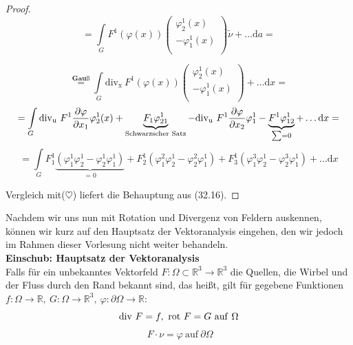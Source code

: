 \begin{proof}
\begin{equation*}
=
    \int\limits_G F^1(\varphi(x))
    \begin{pmatrix}
        \varphi_2^1(x) \\
        -\varphi_1^1(x) \\
    \end{pmatrix}
    \tilde{\nu}
    + \ldots \mathrm{d}a = 
\end{equation*}
    
\begin{equation*}
\stackrel{\textbf{Gauß}}{=}
    \int\limits_G \mathrm{div_x } \ F^1(\varphi(x))
    \begin{pmatrix}
        \varphi_2^1(x) \\
        -\varphi_1^1(x) \\
    \end{pmatrix}
    + \ldots \mathrm{d}x = 
\end{equation*}
\begin{equation*}
=
    \int\limits_G 
    \mathrm{div_u } \ F^1 \frac{\partial{\varphi}}{\partial{x_1}} \varphi_2^1(x)
    + \underbrace{F_1 \varphi_{21}^1}_{\text{Schwarzscher Satz}}
    - \mathrm{div_u } \ F^1 \frac{\partial{\varphi}}{\partial{x_2}} \varphi_1^1
    - \underbrace{F^1 \varphi_{12}^1}_{\sum = 0}
    + \ldots \mathrm{d}x = 
\end{equation*}
\begin{equation*}
=
    \int\limits_G F_1^1 
    \underbrace{\left( \varphi_1^1 \varphi_2^1 - \varphi_2^1 \varphi_1^1 \right)}_{=0}
    + F_2^1 \left( \varphi_1^2 \varphi_2^1 - \varphi_2^2 \varphi_1^1 \right)
    + F_3^1 \left( \varphi_1^3 \varphi_2^1 - \varphi_2^3 \varphi_1^1 \right)
    + \ldots \mathrm{d}x
\end{equation*}

Vergleich mit($\heartsuit$) liefert die Behauptung aus (32.16).

\end{proof}

Nachdem wir uns nun mit Rotation und Divergenz von Feldern auskennen, können wir kurz auf den Hauptsatz der Vektoranalysis 
eingehen, den wir jedoch im Rahmen dieser Vorlesung nicht 
weiter behandeln.\\
\linebreak
\textbf{Einschub: Hauptsatz der Vektoranalysis}\\
Falls für ein unbekanntes Vektorfeld
$F: \Omega \subset \mathbb{R}^3 \rightarrow \mathbb{R}^3 $
die Quellen, die Wirbel und der Fluss durch den Rand bekannt sind, das heißt, gilt für gegebene Funktionen $f: \Omega \rightarrow \mathbb{R}, \ G: \Omega \rightarrow \mathbb{R}^3, \ 
\varphi: \partial \Omega \rightarrow \mathbb{R} $:
\begin{equation*}
\div F = f, \ \rot F = G\ \mathrm{auf\ }\Omega
\end{equation*}
\begin{equation*}
\ F \cdot \nu = \varphi\ \mathrm{auf\ } \partial \Omega 
\end{equation*}


